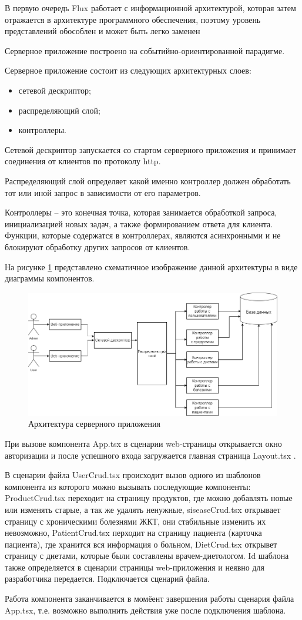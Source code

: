 В первую очередь Flux работает с информационной архитектурой, которая затем отражается в архитектуре программного обеспечения, поэтому уровень представлений обособлен и может быть легко заменен

Серверное приложение построено на событийно-ориентированной парадигме.

Серверное приложение состоит из следующих архитектурных слоев:

\begin{itemize} 
	\item сетевой дескриптор;
	\item распределяющий слой;
	\item контроллеры.
\end{itemize}

Сетевой дескриптор запускается со стартом серверного приложения и принимает соединения от клиентов по протоколу http.

Распределяющий слой определяет какой именно контроллер должен обработать тот или иной запрос в зависимости от его параметров.

Контроллеры – это конечная точка, которая занимается обработкой запроса, инициализацией новых задач, а также формированием ответа для клиента. Функции, которые содержатся в контроллерах, являются асинхронными и не блокируют обработку других запросов от клиентов.

На рисунке \ref{fig:server} представлено схематичное изображение данной архитектуры в виде диаграммы компонентов.

\begin{figure}[H]
	\centering
	\includegraphics[width=0.7\linewidth]{"images/Архитектура серверного приложения.drawio"}
	\caption{Архитектура серверного приложения}
	\label{fig:server}
\end{figure}

При вызове компонента App.tsx в сценарии web-страницы открывается окно авторизации и после успешного входа загружается главная страница Layout.tsx .

В сценарии файла UserCrud.tsx происходит вызов одного из шаблонов компонента из которого можно вызывать последующие компоненты: ProductCrud.tsx переходит на страницу продуктов, где можно добавлять новые или изменять старые, а так же удалять ненужные, siseaseCrud.tsx открывает страницу с хроническими болезнями ЖКТ, они стабильные изменить их невозможно, PatientCrud.tsx перходит на страницу пациента (карточка пациента), где хранится вся информация о больном, DietCrud.tsx открывет страницу с диетами, которые были составлены врачем-диетологом. Id шаблона также определяется в сценарии страницы web-приложения и неявно для разработчика передается. Подключается сценарий файла. 

Работа компонента заканчивается в момёент завершения работы сценария файла App.tsx, т.е. возможно выполнить действия уже после подключения шаблона.